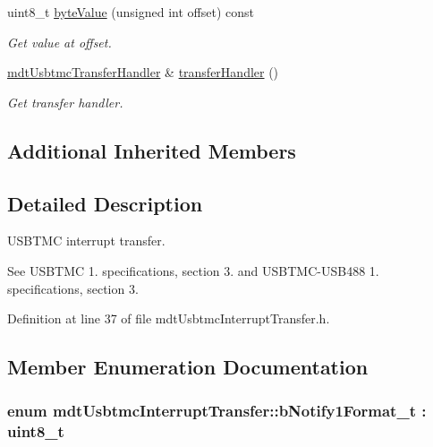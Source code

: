 \begin{DoxyCompactItemize}
uint8\-\_\-t \hyperlink{classmdt_usbtmc_interrupt_transfer_a7c762ec43e4d52c4d09289cd17668b7f}{byte\-Value} (unsigned int offset) const 
\begin{DoxyCompactList}\small\item\em Get value at offset. \end{DoxyCompactList}\item 
\hyperlink{classmdt_usbtmc_transfer_handler}{mdt\-Usbtmc\-Transfer\-Handler} \& \hyperlink{classmdt_usbtmc_interrupt_transfer_ad58031010f130cffe4482e2793536539}{transfer\-Handler} ()
\begin{DoxyCompactList}\small\item\em Get transfer handler. \end{DoxyCompactList}\end{DoxyCompactItemize}
\subsection*{Additional Inherited Members}


\subsection{Detailed Description}
U\-S\-B\-T\-M\-C interrupt transfer. 

See U\-S\-B\-T\-M\-C 1. specifications, section 3. and U\-S\-B\-T\-M\-C-\/\-U\-S\-B488 1. specifications, section 3. 

Definition at line 37 of file mdt\-Usbtmc\-Interrupt\-Transfer.\-h.



\subsection{Member Enumeration Documentation}
\hypertarget{classmdt_usbtmc_interrupt_transfer_ae547608f6ca182cc8312a8f4cbf8b2f1}{
\subsubsection[{b\-Notify1\-Format\-\_\-t}]{\setlength{\rightskip}{0pt plus 5cm}enum {\bf mdt\-Usbtmc\-Interrupt\-Transfer\-::b\-Notify1\-Format\-\_\-t} \-: uint8\-\_\-t\hspace{0.3cm}{\ttfamily [strong]}}}\label{classmdt_usbtmc_interrupt_transfer_ae547608f6ca182cc8312a8f4cbf8b2f1}


